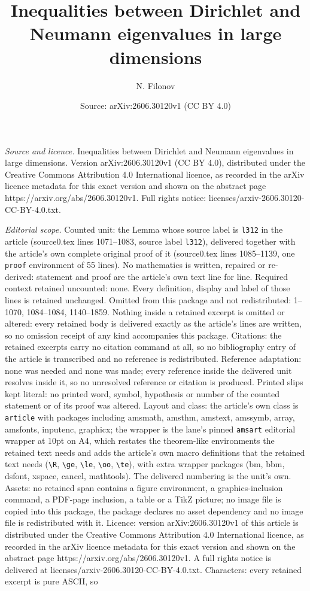 \documentclass[10pt,a4paper]{amsart}
\title[Inequalities between Dirichlet and Neumann eigenvalues in la]{Inequalities between Dirichlet and Neumann eigenvalues in large dimensions}
\author{N. Filonov}
\date{Source: arXiv:2606.30120v1 (CC BY 4.0)}
\begin{document}
\maketitle

\noindent\emph{Source and licence.} Inequalities between Dirichlet and Neumann eigenvalues in large dimensions. Version arXiv:2606.30120v1 (CC BY 4.0), distributed under the Creative Commons Attribution 4.0 International licence, as recorded in the arXiv licence metadata for this exact version and shown on the abstract page https://arxiv.org/abs/2606.30120v1. Full rights notice: licenses/arxiv-2606.30120-CC-BY-4.0.txt.\par\smallskip

\noindent\textit{Editorial scope.} Counted unit: the Lemma whose source label is \texttt{l312} in the article (source0.tex lines 1071--1083, source label \texttt{l312}), delivered together with the article's own complete original proof of it (source0.tex lines 1085--1139, one \texttt{proof} environment of 55 lines). No mathematics is written, repaired or re-derived: statement and proof are the article's own text line for line. Required context retained uncounted: none. Every definition, display and label of those lines is retained unchanged. Omitted from this package and not redistributed: 1--1070, 1084--1084, 1140--1859. Nothing inside a retained excerpt is omitted or altered: every retained body is delivered exactly as the article's lines are written, so no omission receipt of any kind accompanies this package. Citations: the retained excerpts carry no citation command at all, so no bibliography entry of the article is transcribed and no reference is redistributed. Reference adaptation: none was needed and none was made; every reference inside the delivered unit resolves inside it, so no unresolved reference or citation is produced. Printed slips kept literal: no printed word, symbol, hypothesis or number of the counted statement or of its proof was altered. Layout and class: the article's own class is \texttt{article} with packages including amsmath, amsthm, amstext, amssymb, array, amsfonts, inputenc, graphicx; the wrapper is the lane's pinned \texttt{amsart} editorial wrapper at 10pt on A4, which restates the theorem-like environments the retained text needs and adds the article's own macro definitions that the retained text needs (\texttt{\textbackslash R}, \texttt{\textbackslash ge}, \texttt{\textbackslash le}, \texttt{\textbackslash oo}, \texttt{\textbackslash te}), with extra wrapper packages (bm, bbm, dsfont, xspace, cancel, mathtools). The delivered numbering is the unit's own. Assets: no retained span contains a figure environment, a graphics-inclusion command, a PDF-page inclusion, a table or a TikZ picture; no image file is copied into this package, the package declares no asset dependency and no image file is redistributed with it. Licence: version arXiv:2606.30120v1 of this article is distributed under the Creative Commons Attribution 4.0 International licence, as recorded in the arXiv licence metadata for this exact version and shown on the abstract page https://arxiv.org/abs/2606.30120v1. A full rights notice is delivered at licenses/arxiv-2606.30120-CC-BY-4.0.txt. Characters: every retained excerpt is pure ASCII, so 
\end{document}
